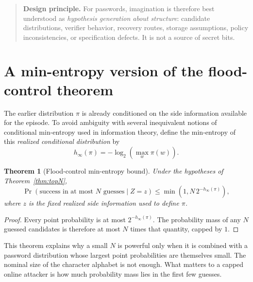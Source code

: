\documentclass[11pt,openany]{book}
\newtheorem{theorem}{Theorem}[chapter]
\theoremstyle{definition}
\theoremstyle{remark}
\newenvironment{designbox}{\begin{quote}\small\color{green!35!black}\textbf{Design principle.} }{\end{quote}}
\begin{document}
\begin{designbox}
For passwords, imagination is therefore best understood as \emph{hypothesis generation about structure}: candidate distributions, verifier behavior, recovery routes, storage assumptions, policy inconsistencies, or specification defects. It is not a source of secret bits.
\end{designbox}

\section{A min-entropy version of the flood-control theorem}
The earlier distribution $\pi$ is already conditioned on the side information available for the episode. To avoid ambiguity with several inequivalent notions of conditional min-entropy used in information theory, define the min-entropy of this \emph{realized conditional distribution} by
\[
h_\infty(\pi)=-\log_2\left(\max_w \pi(w)\right).
\]

\begin{theorem}[Flood-control min-entropy bound]\label{thm:minentropy}
Under the hypotheses of Theorem~\ref{thm:topN},
\[
\Pr(\text{success in at most }N\text{ guesses}\mid Z=z)
\le
\min\left(1,N\,2^{-h_\infty(\pi)}\right),
\]
where $z$ is the fixed realized side information used to define $\pi$.
\end{theorem}
\begin{proof}
Every point probability is at most $2^{-h_\infty(\pi)}$. The probability mass of any $N$ guessed candidates is therefore at most $N$ times that quantity, capped by $1$.
\end{proof}

This theorem explains why a small $N$ is powerful only when it is combined with a password distribution whose largest point probabilities are themselves small. The nominal size of the character alphabet is not enough. What matters to a capped online attacker is how much probability mass lies in the first few guesses.
\end{document}

